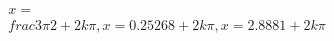 \documentclass[preview]{standalone}
\begin{document}
\begin{align*}
x = \\frac{3\pi}{2} + 2k\pi, x = 0.25268 + 2k\pi, x = 2.8881 + 2k\pi
\end{align*}
\end{document}
